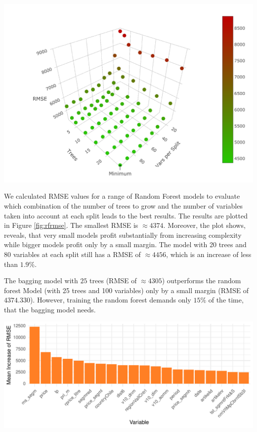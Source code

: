 \documentclass[11pt,]{article}
\let\origfigure\figure
\let\endorigfigure\endfigure
\renewenvironment{figure}[1][2] {
    \expandafter\origfigure\expandafter[H]
} {
    \endorigfigure
}
\begin{document}
\begin{figure}

{\centering \includegraphics{../00_data/output_paper/10_rf_plot}

}

\caption[RMSE's of the Random Forest for Different Parameters]{\label{fig:rfrmse}Random Forest: Dependency between RMSE, the Number of Trees and the Number of Variables Included at each Split.}\label{fig:unnamed-chunk-10}
\end{figure}

We calculated \ac{RMSE} values for a range of Random Forest models to
evaluate which combination of the number of trees to grow and the number
of variables taken into account at each split leads to the best results.
The results are plotted in Figure \ref{fig:rfrmse}. The smallest
\ac{RMSE} is \(\approx 4374\). Moreover, the plot shows, reveals, that
very small models profit substantially from increasing complexity while
bigger models profit only by a small margin. The model with 20 trees and
80 variables at each split still has a \ac{RMSE} of \(\approx 4456\),
which is an increase of less than \(1.9\%\).

The \ac{bagging} model with \(25\) trees (\ac{RMSE} of \(\approx 4305\))
outperforms the random forest Model (with 25 trees and 100 variables)
only by a small margin (\ac{RMSE} of \(4374.330\)). However, training
the random forest demands only \(15\%\) of the time, that the
\ac{bagging} model needs.

\begin{figure}
\centering
\includegraphics{../00_data/output_paper/11_var_imp_random_forest_bp.pdf}
\caption{\label{fig:rfimp}Random Forest: Variable Importance.}
\end{figure}
\end{document}
